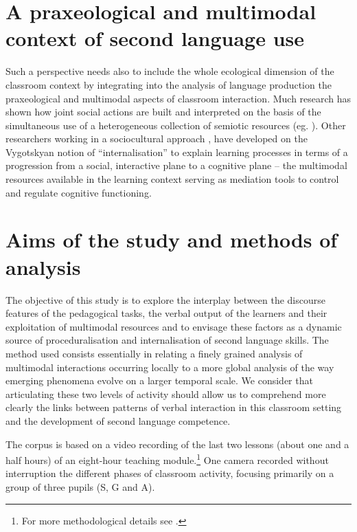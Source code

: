 \documentclass[output=paper]{langscibook}
\begin{document}
\section{A praxeological and multimodal context of second language use} %

Such a perspective needs also to include the whole ecological dimension of the classroom context by integrating into the analysis of language production the praxeological and multimodal aspects of classroom interaction. Much research has shown how joint social actions are built and interpreted on the basis of the simultaneous use of a heterogeneous collection of semiotic resources (eg. \citealt{Goodwin1981,StreeckEtAl2011,Kress2001,Kress2019}). Other researchers working in a sociocultural approach \citep{Lantolf2011,McCafferty2002,NegruelaLantolf2008}, have developed on the Vygotskyan notion of “internalisation” \citep{Galperin1967} to explain learning processes in terms of a progression from a social, interactive plane to a cognitive plane – the multimodal resources available in the learning context serving as mediation tools to control and regulate cognitive functioning.

\section{Aims of the study and methods of analysis} %

The objective of this study is to explore the interplay between the discourse features of the pedagogical tasks, the verbal output of the learners and their exploitation of multimodal resources and to envisage these factors as a dynamic source of proceduralisation and internalisation of second language skills. The method used consists essentially in relating a finely grained analysis of multimodal interactions occurring locally to a more global analysis of the way emerging phenomena evolve on a larger temporal scale. We consider that articulating these two levels of activity should allow us to comprehend more clearly the links between patterns of verbal interaction in this classroom setting and the development of second language competence.

The corpus is based on a video recording of the last two lessons (about one and a half hours) of an eight-hour teaching module.\footnote{For more methodological details see \citet{BlancGriggs2015}.} One camera recorded without interruption the different phases of classroom activity, focusing primarily on a group of three pupils (S, G and A). 
\end{document}
